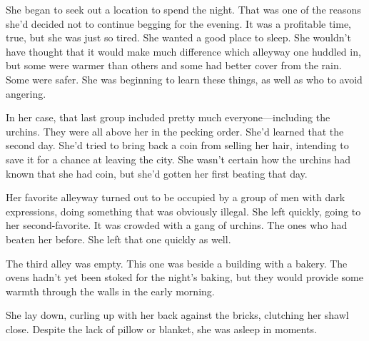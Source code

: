 She began to seek out a location to spend the night. That was one of the reasons she’d decided not to continue begging for the evening. It was a profitable time, true, but she was just so tired. She wanted a good place to sleep. She wouldn’t have thought that it would make much difference which alleyway one huddled in, but some were warmer than others and some had better cover from the rain. Some were safer. She was beginning to learn these things, as well as who to avoid angering.

In her case, that last group included pretty much everyone—including the urchins. They were all above her in the pecking order. She’d learned that the second day. She’d tried to bring back a coin from selling her hair, intending to save it for a chance at leaving the city. She wasn’t certain how the urchins had known that she had coin, but she’d gotten her first beating that day.

Her favorite alleyway turned out to be occupied by a group of men with dark expressions, doing something that was obviously illegal. She left quickly, going to her second-favorite. It was crowded with a gang of urchins. The ones who had beaten her before. She left that one quickly as well.

The third alley was empty. This one was beside a building with a bakery. The ovens hadn’t yet been stoked for the night’s baking, but they would provide some warmth through the walls in the early morning.

She lay down, curling up with her back against the bricks, clutching her shawl close. Despite the lack of pillow or blanket, she was asleep in moments.

